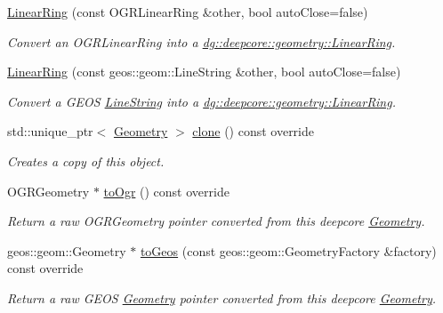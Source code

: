 \begin{DoxyCompactItemize}
\hyperlink{structdg_1_1deepcore_1_1geometry_1_1_linear_ring_abdc373186177459d4c0cd0e19411e2a0}{Linear\+Ring} (const O\+G\+R\+Linear\+Ring \&other, bool auto\+Close=false)
\begin{DoxyCompactList}\small\item\em Convert an O\+G\+R\+Linear\+Ring into a \hyperlink{structdg_1_1deepcore_1_1geometry_1_1_linear_ring}{dg\+::deepcore\+::geometry\+::\+Linear\+Ring}. \end{DoxyCompactList}\item 
\hyperlink{structdg_1_1deepcore_1_1geometry_1_1_linear_ring_ad969f5a3b2e132dbd9fe97a8fe1a53e3}{Linear\+Ring} (const geos\+::geom\+::\+Line\+String \&other, bool auto\+Close=false)
\begin{DoxyCompactList}\small\item\em Convert a G\+E\+OS \hyperlink{structdg_1_1deepcore_1_1geometry_1_1_line_string}{Line\+String} into a \hyperlink{structdg_1_1deepcore_1_1geometry_1_1_linear_ring}{dg\+::deepcore\+::geometry\+::\+Linear\+Ring}. \end{DoxyCompactList}\item 
std\+::unique\+\_\+ptr$<$ \hyperlink{structdg_1_1deepcore_1_1geometry_1_1_geometry}{Geometry} $>$ \hyperlink{structdg_1_1deepcore_1_1geometry_1_1_linear_ring_ab52ae6ef637539dce69ce9d77e8f3e3b}{clone} () const override
\begin{DoxyCompactList}\small\item\em Creates a copy of this object. \end{DoxyCompactList}\item 
O\+G\+R\+Geometry $\ast$ \hyperlink{structdg_1_1deepcore_1_1geometry_1_1_linear_ring_ad6ed925db7ad6b2cc77345d2d2fc704e}{to\+Ogr} () const override
\begin{DoxyCompactList}\small\item\em Return a raw O\+G\+R\+Geometry pointer converted from this deepcore \hyperlink{structdg_1_1deepcore_1_1geometry_1_1_geometry}{Geometry}. \end{DoxyCompactList}\item 
geos\+::geom\+::\+Geometry $\ast$ \hyperlink{structdg_1_1deepcore_1_1geometry_1_1_linear_ring_a887b8c2280ad03fdc7b363f5a59eb299}{to\+Geos} (const geos\+::geom\+::\+Geometry\+Factory \&factory) const override
\begin{DoxyCompactList}\small\item\em Return a raw G\+E\+OS \hyperlink{structdg_1_1deepcore_1_1geometry_1_1_geometry}{Geometry} pointer converted from this deepcore \hyperlink{structdg_1_1deepcore_1_1geometry_1_1_geometry}{Geometry}. \end{DoxyCompactList}\item 

\end{DoxyCompactItemize}
